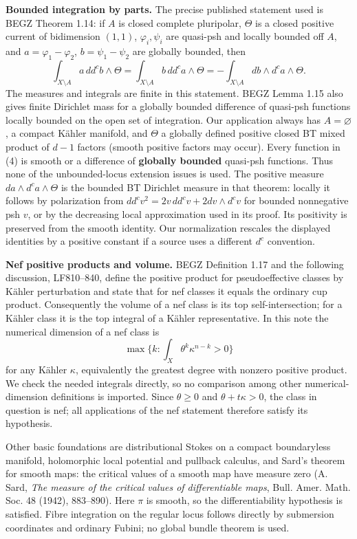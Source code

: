 \documentclass[
  11pt,
]{article}
\begin{document}
\textbf{Bounded integration by parts.} The precise published statement used is BEGZ Theorem 1.14: if \(A\) is closed complete pluripolar, \(\Theta\) is a closed positive current of bidimension \((1,1)\), \(\varphi_i,\psi_i\) are quasi-psh and locally bounded off \(A\), and \(a=\varphi_1-\varphi_2\), \(b=\psi_1-\psi_2\) are globally bounded, then \[
\int_{X\setminus A}a\,dd^c b\wedge\Theta
=\int_{X\setminus A}b\,dd^c a\wedge\Theta
=-\int_{X\setminus A}db\wedge d^c a\wedge\Theta.                       \tag{4}
\] The measures and integrals are finite in this statement. BEGZ Lemma 1.15 also gives finite Dirichlet mass for a globally bounded difference of quasi-psh functions locally bounded on the open set of integration. Our application always has \(A=\varnothing\), a compact Kähler manifold, and \(\Theta\) a globally defined positive closed BT mixed product of \(d-1\) factors (smooth positive factors may occur). Every function in (4) is smooth or a difference of \textbf{globally bounded} quasi-psh functions. Thus none of the unbounded-locus extension issues is used. The positive measure \(da\wedge d^c a\wedge\Theta\) is the bounded BT Dirichlet measure in that theorem: locally it follows by polarization from \(dd^c v^2=2v\,dd^c v+2dv\wedge d^c v\) for bounded nonnegative psh \(v\), or by the decreasing local approximation used in its proof. Its positivity is preserved from the smooth identity. Our normalization rescales the displayed identities by a positive constant if a source uses a different \(d^c\) convention.

\textbf{Nef positive products and volume.} BEGZ Definition 1.17 and the following discussion, LF810--840, define the positive product for pseudoeffective classes by Kähler perturbation and state that for nef classes it equals the ordinary cup product. Consequently the volume of a nef class is its top self-intersection; for a Kähler class it is the top integral of a Kähler representative. In this note the numerical dimension of a nef class is \[
\max\{k:\int_X\theta^k\kappa^{n-k}>0\}
\] for any Kähler \(\kappa\), equivalently the greatest degree with nonzero positive product. We check the needed integrals directly, so no comparison among other numerical-dimension definitions is imported. Since \(\theta\geq0\) and \(\theta+t\kappa>0\), the class in question is nef; all applications of the nef statement therefore satisfy its hypothesis.

Other basic foundations are distributional Stokes on a compact boundaryless manifold, holomorphic local potential and pullback calculus, and Sard's theorem for smooth maps: the critical values of a smooth map have measure zero (A. Sard, \emph{The measure of the critical values of differentiable maps}, Bull. Amer. Math. Soc. 48 (1942), 883--890). Here \(\pi\) is smooth, so the differentiability hypothesis is satisfied. Fibre integration on the regular locus follows directly by submersion coordinates and ordinary Fubini; no global bundle theorem is used.
\end{document}
